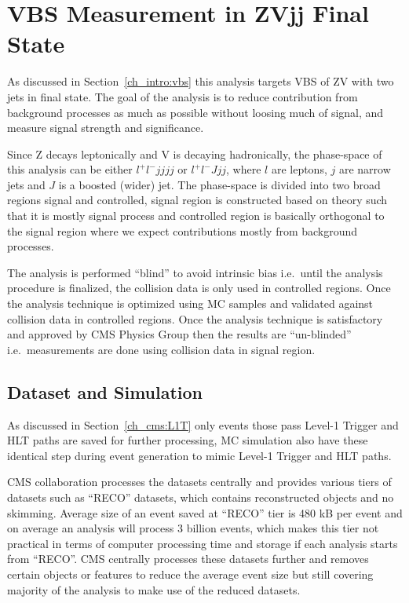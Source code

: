 \chapter{
  VBS Measurement in ZVjj Final State
 }\label{ch_vbs}

As discussed in Section~\ref{ch_intro:vbs} this analysis targets
\gls{VBS} of ZV with two jets in final state. The goal of the analysis
is to reduce contribution from background processes as much as possible
without loosing much of signal, and measure signal strength and significance.

Since Z decays leptonically and V is decaying hadronically,
the phase-space of this analysis can be either
\( l^+ l^- jjjj \) or \( l^+ l^- J jj\), where \( l \) are leptons,
\( j \) are narrow jets and \( J \) is a boosted (wider) jet.
The phase-space is divided into two broad regions signal and controlled,
signal region is constructed based on theory such that it is mostly signal process
and controlled region is basically orthogonal to the signal region
where we expect contributions mostly from background processes.

The analysis is performed ``blind'' to avoid intrinsic bias
i.e.\ until the analysis procedure is finalized, the collision data is only used
in controlled regions. Once the analysis technique is optimized using \gls{MC}
samples and validated against collision data in controlled regions. Once the
analysis technique is satisfactory and approved by \gls{CMS} Physics Group
then the results are ``un-blinded'' i.e.\ measurements are done
using collision data in signal region.

\section{
  Dataset and Simulation
 }

As discussed in Section~\ref{ch_cms:L1T} only events those pass Level-1
Trigger and \gls{HLT} paths are saved for further processing, \gls{MC}
simulation also have these identical step during event generation to mimic
Level-1 Trigger and \gls{HLT} paths.

\gls{CMS} collaboration processes the datasets centrally and provides various
tiers of datasets such as ``RECO'' datasets, which contains reconstructed
objects and no skimming. Average size of an event saved at ``RECO'' tier is
480 kB per event and on average an analysis will process
3 billion events, which makes this tier not practical in terms of computer processing
time and storage if each analysis starts from ``RECO''. \gls{CMS} centrally
processes these datasets further and removes certain objects
or features to reduce the average event size but still covering
majority of the analysis to make use of the reduced datasets.

